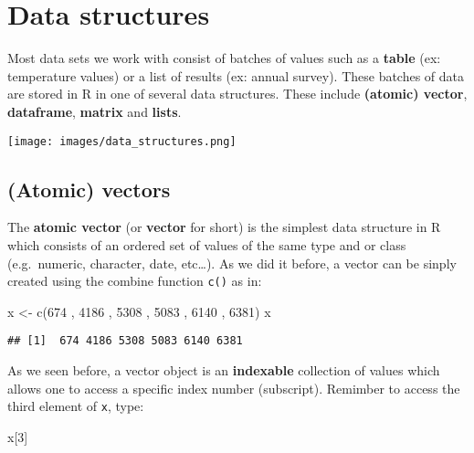 \documentclass[
]{article}
\newenvironment{Shaded}{\begin{snugshade}}{\end{snugshade}}
\newcommand{\DecValTok}[1]{\textcolor[rgb]{0.00,0.00,0.81}{#1}}
\newcommand{\FunctionTok}[1]{\textcolor[rgb]{0.00,0.00,0.00}{#1}}
\newcommand{\NormalTok}[1]{#1}
\newcommand{\OtherTok}[1]{\textcolor[rgb]{0.56,0.35,0.01}{#1}}
\begin{document}
\hypertarget{data-structures}{%
\section{Data structures}\label{data-structures}}

Most data sets we work with consist of batches of values such as a
\textbf{table} (ex: temperature values) or a list of results (ex: annual
survey). These batches of data are stored in R in one of several data
structures. These include \textbf{(atomic) vector}, \textbf{dataframe},
\textbf{matrix} and \textbf{lists}.

\texttt{[image: images/data\_structures.png]}

\hypertarget{atomic-vectors}{%
\subsection{(Atomic) vectors}\label{atomic-vectors}}

The \textbf{atomic vector} (or \textbf{vector} for short) is the
simplest data structure in R which consists of an ordered set of values
of the same type and or class (e.g.~numeric, character, date,
etc\ldots). As we did it before, a vector can be sinply created using
the combine function \texttt{c()} as in:

\begin{Shaded}
\begin{Highlighting}[]
\NormalTok{x }\OtherTok{\textless{}{-}} \FunctionTok{c}\NormalTok{(}\DecValTok{674}\NormalTok{ , }\DecValTok{4186}\NormalTok{ , }\DecValTok{5308}\NormalTok{ , }\DecValTok{5083}\NormalTok{ , }\DecValTok{6140}\NormalTok{ , }\DecValTok{6381}\NormalTok{)}
\NormalTok{x}
\end{Highlighting}
\end{Shaded}

\begin{verbatim}
## [1]  674 4186 5308 5083 6140 6381
\end{verbatim}

As we seen before, a vector object is an \textbf{indexable} collection
of values which allows one to access a specific index number
(subscript). Remimber to access the third element of \texttt{x}, type:

\begin{Shaded}
\begin{Highlighting}[]
\NormalTok{x[}\DecValTok{3}\NormalTok{]}
\end{Highlighting}
\end{Shaded}
\end{document}
